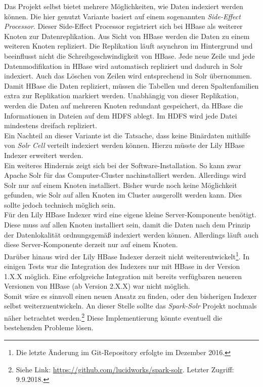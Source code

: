 \noindent
Das Projekt selbst bietet mehrere Möglichkeiten, wie Daten indexiert werden können. Die hier genutzt Variante basiert auf einem sogenannten \textit{Side-Effect Processor}.\cite{hbase_sep} 
Dieser Side-Effect Processor registriert sich bei HBase als weiterer Knoten zur Datenreplikation. Aus Sicht von HBase werden die Daten zu einem weiteren Knoten repliziert. 
Die Replikation läuft asynchron im Hintergrund und beeinflusst nicht die Schreibgeschwindigkeit von HBase. Jede neue Zeile und jede Datenmodifikation in HBase wird automatisch repliziert und dadurch in Solr indexiert.
Auch das Löschen von Zeilen wird entsprechend in Solr übernommen. Damit HBase die Daten repliziert, müssen die Tabellen und deren Spaltenfamilien extra zur Replikation markiert werden. Unabhängig von dieser Replikation, werden die Daten auf mehreren Knoten redundant gespeichert, da HBase die Informationen in Dateien auf dem HDFS ablegt. Im HDFS wird jede Datei mindestens dreifach repliziert.\\

\noindent
Ein Nachteil an dieser Variante ist die Tatsache, dass keine Binärdaten mithilfe von \textit{Solr Cell} verteilt indexiert werden können. Hierzu müsste der Lily HBase Indexer erweitert werden.\\
Ein weiteres Hindernis zeigt sich bei der Software-Installation. So kann zwar Apache Solr für das Computer-Cluster nachinstalliert werden. Allerdings wird Solr nur auf einem Knoten installiert. Bisher wurde noch keine Möglichkeit gefunden, wie Solr auf allen Knoten im Cluster ausgerollt werden kann. Dies sollte jedoch technisch möglich sein.\\
Für den Lily HBase Indexer wird eine eigene kleine Server-Komponente benötigt. Diese muss auf allen Knoten installiert sein, damit die Daten nach dem Prinzip der Datenlokalität ordnungsgemäß indexiert werden können. Allerdings läuft auch diese Server-Komponente derzeit nur auf einem Knoten.\\
Darüber hinaus wird der Lily HBase Indexer derzeit nicht weiterentwickelt\footnote{Die letzte Änderung im Git-Repository erfolgte im Dezember 2016.}. In einigen Tests war die Integration des Indexers nur mit HBase in der Version 1.X.X möglich. Eine erfolgreiche Integration mit bereits verfügbaren neueren Versionen von HBase  (ab Version 2.X.X) war nicht möglich.\\ 

\noindent
Somit wäre es sinnvoll einen neuen Ansatz zu finden, oder den bisherigen Indexer selbst weiterzuentwickeln. An dieser Stelle sollte das \textit{Spark-Solr} Projekt nochmals näher betrachtet werden.\footnote{Siehe Link: \url{https://github.com/lucidworks/spark-solr}. Letzter Zugriff: 9.9.2018.} Diese Implementierung könnte eventuell die bestehenden Probleme lösen. 



